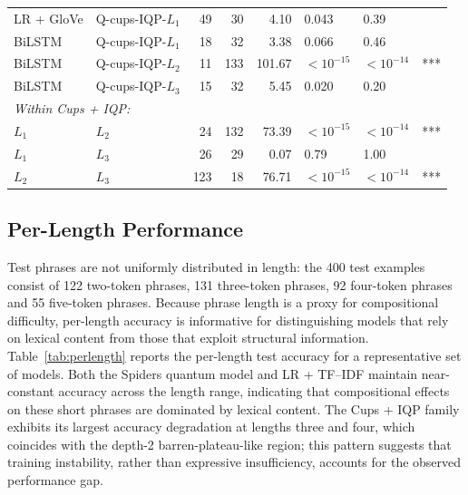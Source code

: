 \documentclass[11pt, a4paper]{article}
\begin{document}
\begin{table}[H]
\begin{tabular}{llrrrlll}
LR + GloVe   & Q-cups-IQP-\(L_1\) & 49 & 30  & 4.10   & 0.043     & 0.39     &     \\
BiLSTM       & Q-cups-IQP-\(L_1\) & 18 & 32  & 3.38   & 0.066     & 0.46     &     \\
BiLSTM       & Q-cups-IQP-\(L_2\) & 11 & 133 & 101.67 & \(<10^{-15}\) & \(<10^{-14}\) & *** \\
BiLSTM       & Q-cups-IQP-\(L_3\) & 15 & 32  & 5.45   & 0.020     & 0.20     &     \\
\multicolumn{8}{l}{\emph{Within Cups + IQP:}} \\
\(L_1\) & \(L_2\) & 24 & 132 & 73.39 & \(<10^{-15}\) & \(<10^{-14}\) & *** \\
\(L_1\) & \(L_3\) & 26 & 29  & 0.07  & 0.79          & 1.00     &     \\
\(L_2\) & \(L_3\) & 123 & 18 & 76.71 & \(<10^{-15}\) & \(<10^{-14}\) & *** \\
\bottomrule
\end{tabular}
\end{table}

\subsection{Per-Length Performance}

Test phrases are not uniformly distributed in length: the 400 test
examples consist of 122 two-token phrases, 131 three-token phrases,
92 four-token phrases and 55 five-token phrases. Because phrase
length is a proxy for compositional difficulty, per-length accuracy
is informative for distinguishing models that rely on lexical content
from those that exploit structural information.
Table~\ref{tab:perlength} reports the per-length test accuracy for a
representative set of models. Both the Spiders quantum model and
LR + TF--IDF maintain near-constant accuracy across the length range,
indicating that compositional effects on these short phrases are
dominated by lexical content. The Cups + IQP family exhibits its
largest accuracy degradation at lengths three and four, which
coincides with the depth-2 barren-plateau-like region; this pattern
suggests that training instability, rather than expressive
insufficiency, accounts for the observed performance gap.
\end{document}
